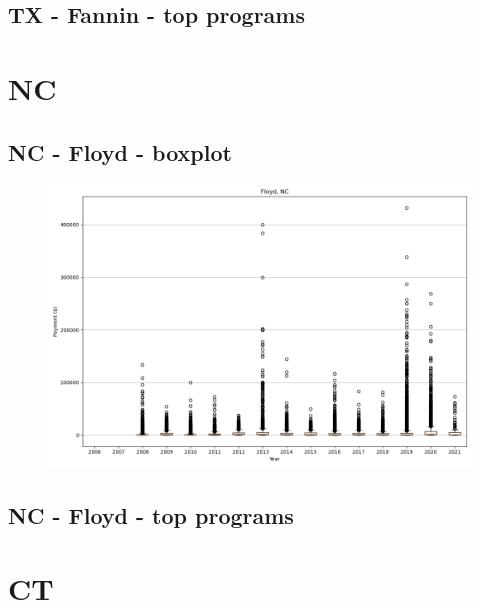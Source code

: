 \subsection*{TX - Fannin - top programs}

\newpage
\section*{NC}
\subsection*{NC - Floyd - boxplot}
\begin{figure}[h]
\centering
\includegraphics[width=7in]{../output/boxplots/counties/Floyd-NC_boxplot.png}
\end{figure}


\subsection*{NC - Floyd - top programs}

\newpage
\section*{CT}
